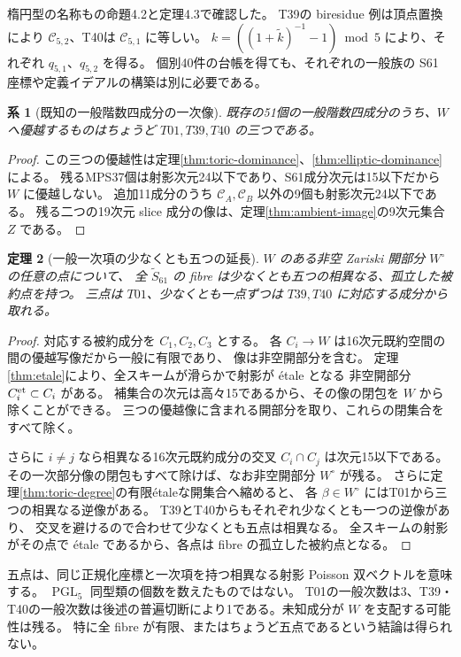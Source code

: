 \documentclass[11pt,a4paper]{ltjsarticle}
\DeclareMathOperator{\PGL}{PGL}
\newtheorem{theorem}{定理}[section]
\newtheorem{corollary}[theorem]{系}
\theoremstyle{remark}
\begin{document}
楕円型の名称も\cite{matviichuk}の命題4.2と定理4.3で確認した。
T39の biresidue 例は頂点置換により $\mathcal C_{5,2}$、T40は $\mathcal C_{5,1}$ に等しい。
$k=((1+\widetilde k)^{-1}-1)\bmod5$ により、それぞれ $q_{5,1}$、$q_{5,2}$ を得る。
個別40件の台帳を得ても、それぞれの一般族の S61 座標や定義イデアルの構築は別に必要である。

\begin{corollary}[既知の一般階数四成分の一次像]\label{cor:known-dominant}
既存の51個の一般階数四成分のうち、$W$ へ優越するものはちょうど
$T01,T39,T40$ の三つである。
\end{corollary}
\begin{proof}
この三つの優越性は定理\ref{thm:toric-dominance}、\ref{thm:elliptic-dominance}による。
残るMPS37個は射影次元24以下であり、S61成分次元は15以下だから $W$ に優越しない。
追加11成分のうち $\mathcal C_A,\mathcal C_B$ 以外の9個も射影次元24以下である。
残る二つの19次元 slice 成分の像は、定理\ref{thm:ambient-image}の9次元集合 $Z$ である。
\end{proof}

\begin{theorem}[一般一次項の少なくとも五つの延長]\label{thm:five-lifts}
$W$ のある非空 Zariski 開部分 $W^\circ$ の任意の点について、
全 $\widetilde S_{61}$ の fibre は少なくとも五つの相異なる、孤立した被約点を持つ。
三点は $T01$、少なくとも一点ずつは $T39,T40$ に対応する成分から取れる。
\end{theorem}
\begin{proof}
対応する被約成分を $C_1,C_2,C_3$ とする。
各 $C_i\to W$ は16次元既約空間の間の優越写像だから一般に有限であり、
像は非空開部分を含む。
定理\ref{thm:etale}により、全スキームが滑らかで射影が \'etale となる
非空開部分 $C_i^{\rm et}\subset C_i$ がある。
補集合の次元は高々15であるから、その像の閉包を $W$ から除くことができる。
三つの優越像に含まれる開部分を取り、これらの閉集合をすべて除く。

さらに $i\ne j$ なら相異なる16次元既約成分の交叉 $C_i\cap C_j$ は次元15以下である。
その一次部分像の閉包もすべて除けば、なお非空開部分 $W^\circ$ が残る。
さらに定理\ref{thm:toric-degree}の有限\'etaleな開集合へ縮めると、
各 $\beta\in W^\circ$ にはT01から三つの相異なる逆像がある。
T39とT40からもそれぞれ少なくとも一つの逆像があり、
交叉を避けるので合わせて少なくとも五点は相異なる。
全スキームの射影がその点で \'etale であるから、各点は fibre の孤立した被約点となる。
\end{proof}

五点は、同じ正規化座標と一次項を持つ相異なる射影 Poisson 双ベクトルを意味する。
$\PGL_5$ 同型類の個数を数えたものではない。
T01の一般次数は3、T39・T40の一般次数は後述の普遍切断により1である。未知成分が $W$ を支配する可能性は残る。
特に全 fibre が有限、またはちょうど五点であるという結論は得られない。
\end{document}
